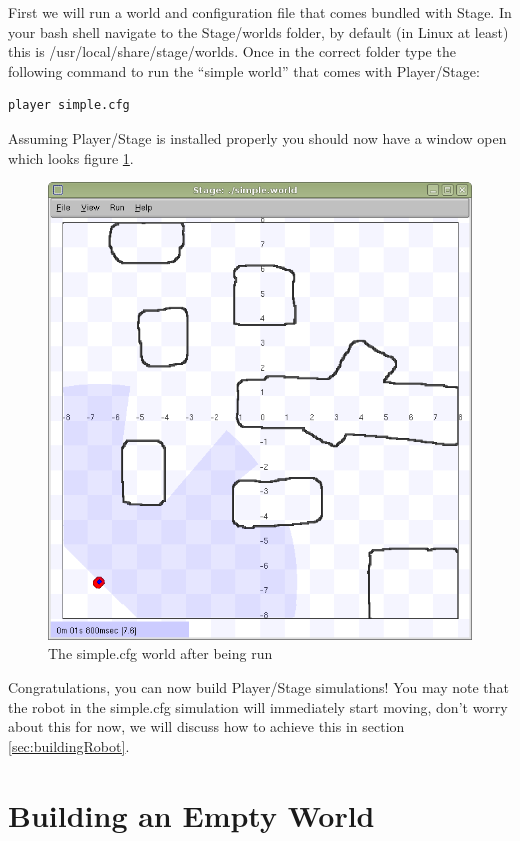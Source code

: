 \documentclass[a4paper]{report}
\newcommand{\plst}{Player/Stage\xspace}
\begin{document}
First we will run a world and configuration file that comes bundled with Stage. In your bash shell navigate to the Stage/worlds folder, by default (in Linux at least) this is /usr/local/share/stage/worlds. Once in the correct folder type the following command to run the ``simple world'' that comes with \plst:
\begin{verbatim}
player simple.cfg
\end{verbatim}
Assuming \plst is installed properly you should now have a window open which looks figure \ref{fig:simpleworldpic}.
\begin{figure}
	\centering
	\includegraphics[width=0.8\linewidth]{./revised_pics/simpleworld.png}
	\caption{The simple.cfg world after being run}
	\label{fig:simpleworldpic}
\end{figure}

Congratulations, you can now build Player/Stage simulations! You may note that the robot in the simple.cfg simulation will immediately start moving, don't worry about this for now, we will discuss how to achieve this in section \ref{sec:buildingRobot}.


\section{Building an Empty World} \label{sec:emptyWorld}
\end{document}
